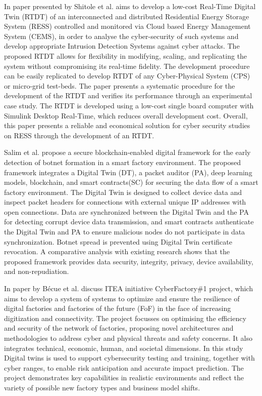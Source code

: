  In\cite{shitoleRealTimeDigitalTwin2021} paper presented by Shitole et al. aims to develop a low-cost Real-Time Digital Twin (RTDT) of an interconnected and distributed Residential Energy Storage System (RESS) controlled and monitored via Cloud based Energy Management System (CEMS), in order to analyse the cyber-security of such systems and develop appropriate Intrusion Detection Systems against cyber attacks. The proposed RTDT allows for flexibility in modifying, scaling, and replicating the system without compromising its real-time fidelity. The development procedure can be easily replicated to develop RTDT of any Cyber-Physical System (CPS) or micro-grid test-beds. The paper presents a systematic procedure for the development of the RTDT and verifies its performance through an experimental case study. The RTDT is developed using a low-cost single board computer with Simulink Desktop Real-Time, which reduces overall development cost. Overall, this paper presents a reliable and economical solution for cyber security studies on RESS through the development of an RTDT.


 Salim et al.\cite{salimBlockchainEnabledSecureDigital2022} propose a secure blockchain-enabled digital framework for the early detection of botnet formation in a smart factory environment. The proposed framework integrates a Digital Twin (DT), a packet auditor (PA), deep learning models, blockchain, and smart contracts(SC) for securing the data flow of a smart factory environment. The Digital Twin is designed to collect device data and inspect packet headers for connections with external unique IP addresses with open connections. Data are synchronized between the Digital Twin and the PA for detecting corrupt device data transmission, and smart contracts authenticate the Digital Twin and PA to ensure malicious nodes do not participate in data synchronization. Botnet spread is prevented using Digital Twin certificate revocation. A comparative analysis with existing research shows that the proposed framework provides data security, integrity, privacy, device availability, and non-repudiation.


In \cite{becueCyberFactorySecuringIndustry40with2018} paper by Bécue et al. discuss ITEA initiative CyberFactory\#1 project, which aims to develop a system of systems to optimize and ensure the resilience of digital factories and factories of the future (FoF) in the face of increasing digitization and connectivity. The project focusses on optimising the efficiency and security of the network of factories, proposing novel architectures and methodologies to address cyber and physical threats and safety concerns. It also integrates technical, economic, human, and societal dimensions. In this study Digital twins is used to support cybersecurity testing and training, together with cyber ranges, to enable risk anticipation and accurate impact prediction. The project demonstrates key capabilities in realistic environments and reflect the variety of possible new factory types and business model shifts.



